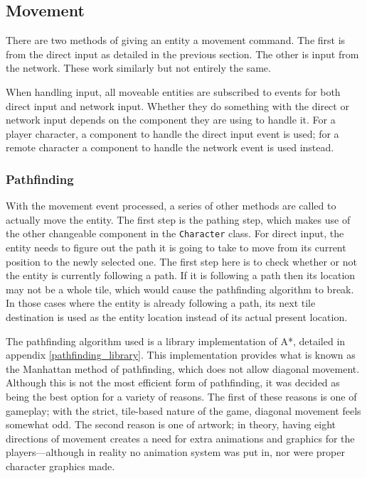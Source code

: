 \subsection{Movement}
There are two methods of giving an entity a movement command. The first is from the direct input as detailed in the previous section. The other is input from the network. These work similarly but not entirely the same.

When handling input, all moveable entities are subscribed to events for both direct input and network input. Whether they do something with the direct or network input depends on the component they are using to handle it. For a player character, a component to handle the direct input event is used; for a remote character a component to handle the network event is used instead.

\subsubsection{Pathfinding}
With the movement event processed, a series of other methods are called to actually move the entity. The first step is the pathing step, which makes use of the other changeable component in the \texttt{Character} class. For direct input, the entity needs to figure out the path it is going to take to move from its current position to the newly selected one. The first step here is to check whether or not the entity is currently following a path. If it is following a path then its location may not be a whole tile, which would cause the pathfinding algorithm to break. In those cases where the entity is already following a path, its next tile destination is used as the entity location instead of its actual present location.

The pathfinding algorithm used is a library implementation of A*, detailed in appendix \ref{pathfinding_library}. This implementation provides what is known as the Manhattan method of pathfinding, which does not allow diagonal movement. Although this is not the most efficient form of pathfinding, it was decided as being the best option for a variety of reasons. The first of these reasons is one of gameplay; with the strict, tile-based nature of the game, diagonal movement feels somewhat odd. The second reason is one of artwork; in theory, having eight directions of movement creates a need for extra animations and graphics for the players---although in reality no animation system was put in, nor were proper character graphics made.

